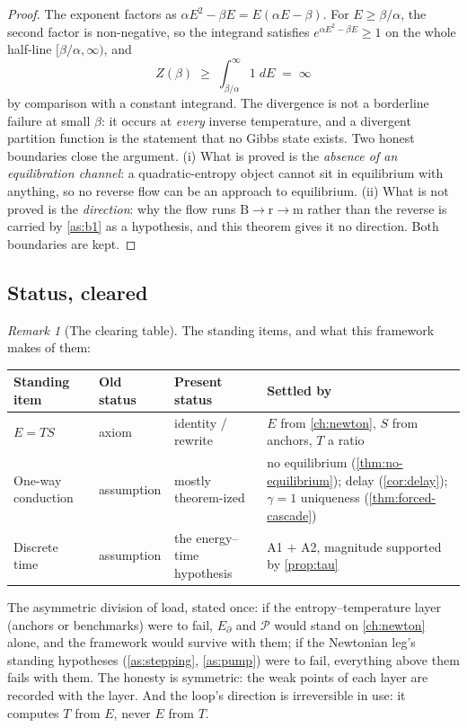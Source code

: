 \documentclass[11pt]{amsbook}
\theoremstyle{plain}
\theoremstyle{definition}
\theoremstyle{remark}
\newtheorem{remark}[theorem]{Remark}
\begin{document}
\begin{proof}
The exponent factors as $\alpha E^{2} - \beta E = E(\alpha E - \beta)$. For $E \geq \beta/\alpha$, the second factor is non-negative, so the integrand satisfies $e^{\alpha E^{2} - \beta E} \geq 1$ on the whole half-line $[\beta/\alpha, \infty)$, and
\begin{equation}\label{eq:divergence}
Z(\beta) \;\geq\; \int_{\beta/\alpha}^{\infty} 1\;dE \;=\; \infty
\end{equation}
by comparison with a constant integrand. The divergence is not a borderline failure at small $\beta$: it occurs at \emph{every} inverse temperature, and a divergent partition function is the statement that no Gibbs state exists. Two honest boundaries close the argument. (i) What is proved is the \emph{absence of an equilibration channel}: a quadratic-entropy object cannot sit in equilibrium with anything, so no reverse flow can be an approach to equilibrium. (ii) What is not proved is the \emph{direction}: why the flow runs $\mathrm B \to \mathrm r \to \mathrm m$ rather than the reverse is carried by \cref{as:b1} as a hypothesis, and this theorem gives it no direction. Both boundaries are kept.
\end{proof}

\subsection{Status, cleared}\label{sec:clearing}

\begin{remark}[The clearing table]\label{rem:clearing}
The standing items, and what this framework makes of them:
\begin{center}
\begin{tabular}{@{}p{2.2cm}p{1.8cm}p{2.8cm}p{4.3cm}@{}}
\toprule
Standing item & Old status & Present status & Settled by \\
\midrule
$E = TS$ & axiom & identity / rewrite & $E$ from \cref{ch:newton}, $S$ from anchors, $T$ a ratio \\
One-way conduction & assumption & mostly theorem-ized & no equilibrium (\cref{thm:no-equilibrium}); delay (\cref{cor:delay}); $\gamma = 1$ uniqueness (\cref{thm:forced-cascade}) \\
Discrete time & assumption & the energy--time hypothesis & A1 $+$ A2, magnitude supported by \cref{prop:tau} \\
\bottomrule
\end{tabular}
\end{center}
The asymmetric division of load, stated once: if the entropy--temperature layer (anchors or benchmarks) were to fail, $E_{\partial}$ and $\mathcal P$ would stand on \cref{ch:newton} alone, and the framework would survive with them; if the Newtonian leg's standing hypotheses (\cref{as:stepping}, \cref{as:pump}) were to fail, everything above them fails with them. The honesty is symmetric: the weak points of each layer are recorded with the layer. And the loop's direction is irreversible in use: it computes $T$ from $E$, never $E$ from $T$.
\end{remark}
\end{document}
